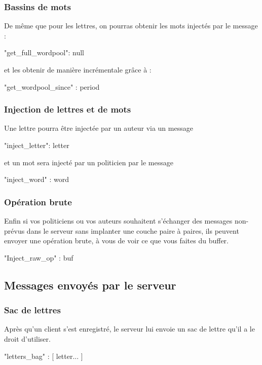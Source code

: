 \documentclass{article}
\begin{document}
\subsubsection{Bassins de mots}
\label{sec:bassins-de-lettre}
De même que pour les lettres, on pourras obtenir les mots injectés par
le message :
\begin{jsonMessage}
  { "get_full_wordpool": null}
\end{jsonMessage}
et les obtenir de manière incrémentale grâce à :
\begin{jsonMessage}
  { "get_wordpool_since" : period}
\end{jsonMessage}
\subsubsection{Injection de lettres et de mots}
\label{sec:injection}
Une lettre pourra être injectée par un auteur via un message
\begin{jsonMessage}
  { "inject_letter": letter }
\end{jsonMessage}
et un mot sera injecté par un politicien par le message
\begin{jsonMessage}
  { "inject_word" : word }
\end{jsonMessage}

\subsubsection{Opération brute}
\label{sec:operation-brute}

Enfin si vos politiciens ou vos auteurs souhaitent s'échanger des
messages non-prévus dans le serveur sans implanter une couche paire à
paires, ils peuvent envoyer une opération brute, à vous de voir ce que
vous faites du buffer.
\begin{jsonMessage}
  { "Inject_raw_op" : buf }
\end{jsonMessage}
\subsection{Messages envoyés par le serveur}
\label{sec:messages-envoyes}

\subsubsection{Sac de lettres}
\label{sec:sac-de-lettres}
Après qu'un client s'est enregistré, le serveur lui envoie un sac de
lettre qu'il a le droit d'utiliser.
\begin{jsonMessage}
  { "letters_bag" : [ letter... ] }
\end{jsonMessage}
\end{document}
